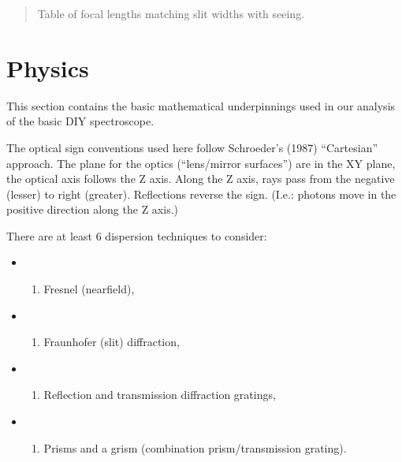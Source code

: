 \documentclass[letterpaper,10pt,english,openany,oneside]{sphinxmanual}
\begin{document}
\begin{quote}
\sphinxAtStartPar
Table of focal lengths matching slit widths with seeing.
\end{quote}

\ignorespaces 

\chapter{Physics}
\label{\detokenize{physics:physics}}\label{\detokenize{physics::doc}}
\sphinxAtStartPar
This section contains the basic mathematical underpinnings used in our
analysis of the basic DIY spectroscope.

\sphinxAtStartPar
The optical sign conventions used here follow Schroeder’s (1987)
“Cartesian” approach. The plane for the optics (“lens/mirror surfaces”)
are in the XY plane, the optical axis follows the Z axis.  Along the Z
axis, rays pass from the negative (lesser) to right
(greater). Reflections reverse the sign. (I.e.: photons move in the
positive direction along the Z axis.)

\sphinxAtStartPar
There are at least 6 dispersion techniques to consider:
\begin{itemize}
\item {} \begin{enumerate}
%
\item {} 
\sphinxAtStartPar
Fresnel (nearfield),

\end{enumerate}

\item {} \begin{enumerate}
%
\item {} 
\sphinxAtStartPar
Fraunhofer (slit) diffraction,

\end{enumerate}

\item {} \begin{enumerate}
%
\setcounter{enumi}{1}
\item {} 
\sphinxAtStartPar
Reflection and transmission diffraction gratings,

\end{enumerate}

\item {} \begin{enumerate}
%
\setcounter{enumi}{1}
\item {} 
\sphinxAtStartPar
Prisms and a grism (combination prism/transmission grating).

\end{enumerate}

\end{itemize}
\end{document}
